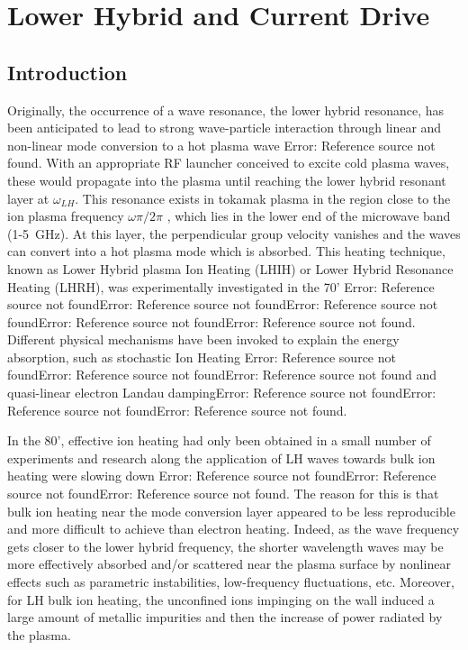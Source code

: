 \chapter{Lower Hybrid and Current Drive}


\section{Introduction}
Originally, the occurrence of a wave resonance, the lower hybrid resonance, has been anticipated to lead to strong wave-particle interaction through linear and non-linear mode conversion to a hot plasma wave Error: Reference source not found. With an appropriate RF launcher conceived to excite cold plasma waves, these would propagate into the plasma until reaching the lower hybrid resonant layer at $\omega_{LH}$. This resonance exists in tokamak plasma in the region close to the ion plasma frequency $\omega \pi/2\pi$ , which lies in the lower end of the microwave band (1-5 GHz). At this layer, the perpendicular group velocity vanishes and the waves can convert into a hot plasma mode which is absorbed. This heating technique, known as Lower Hybrid plasma Ion Heating (LHIH) or Lower Hybrid Resonance Heating (LHRH), was experimentally investigated in the 70' Error: Reference source not foundError: Reference source not foundError: Reference source not foundError: Reference source not foundError: Reference source not found. Different physical mechanisms have been invoked to explain the energy absorption, such as stochastic Ion Heating Error: Reference source not foundError: Reference source not foundError: Reference source not found and quasi-linear electron Landau dampingError: Reference source not foundError: Reference source not foundError: Reference source not found.

In the 80', effective ion heating had only been obtained in a small number of experiments and research along the application of LH waves towards bulk ion heating were slowing down Error: Reference source not foundError: Reference source not foundError: Reference source not found. The reason for this is that bulk ion heating near the mode conversion layer appeared to be less reproducible and more difficult to achieve than electron heating. Indeed, as the wave frequency gets closer to the lower hybrid frequency, the shorter wavelength waves may be more effectively absorbed and/or scattered near the plasma surface by nonlinear effects such as parametric instabilities, low-frequency fluctuations, etc. Moreover, for LH bulk ion heating, the unconfined ions impinging on the wall induced a large amount of metallic impurities and then the increase of power radiated by the plasma.

